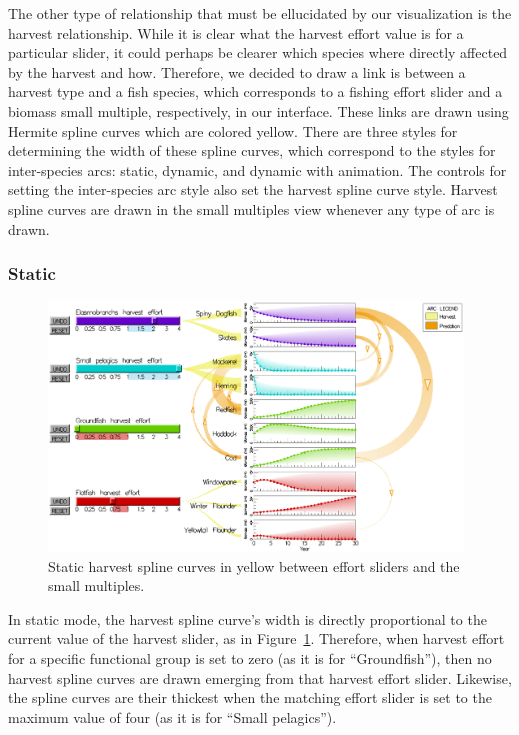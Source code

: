 The other type of relationship that must be ellucidated by our visualization is the harvest relationship.  While it is clear what the harvest effort value is for a particular slider, it could perhaps be clearer which species where directly affected by the harvest and how.  Therefore, we decided to draw a link is between a harvest type and a fish species, which corresponds to a fishing effort slider and a biomass small multiple, respectively, in our interface.  These links are drawn using Hermite spline curves which are colored yellow.  There are three styles for determining the width of these spline curves, which correspond to the styles for inter-species arcs: static, dynamic, and dynamic with animation.  The controls for setting the inter-species arc style also set the harvest spline curve style.  Harvest spline curves are drawn in the small multiples view whenever any type of arc is drawn.

\subsubsection{Static}

\begin{figure}[h]
	\centering
	\includegraphics[width=0.98\textwidth]{figures/eps/harvest_splines.eps}
	\caption{Static harvest spline curves in yellow between effort sliders and the small multiples.}
	\label{fig:harvest_splines}
\end{figure}

In static mode, the harvest spline curve's width is directly proportional to the current value of the harvest slider, as in Figure~\ref{fig:harvest_splines}.  Therefore, when harvest effort for a specific functional group is set to zero (as it is for ``Groundfish''), then no harvest spline curves are drawn emerging from that harvest effort slider.  Likewise, the spline curves are their thickest when the matching effort slider is set to the maximum value of four (as it is for ``Small pelagics'').

